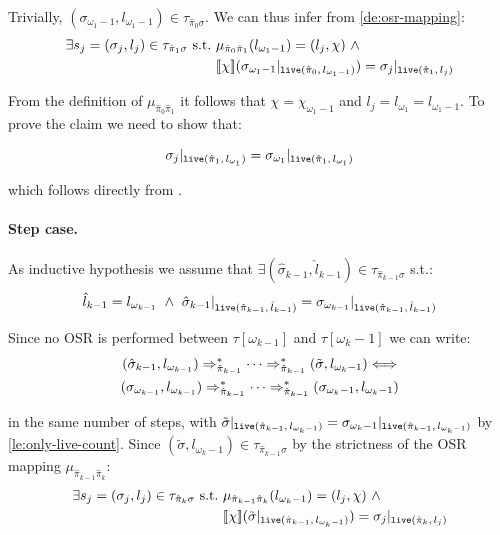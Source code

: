 \begin{myproof}
\noindent Trivially, $(\sigma_{\omega_1-1},l_{\omega_1-1})\in\tau_{\hat{\pi}_0\sigma}$. We can thus infer from \ref{de:osr-mapping}:
\begin{align*}
\exists s_j=(\sigma_j,l_j)\in\tau_{\hat{\pi}_1\sigma}~\text{s.t.}~&\mu_{\hat{\pi}_{0}\hat{\pi}_1}(l_{\omega_1-1})=(l_j,\chi)~\wedge \\
&[\![\chi]\!](\sigma_{\omega_1-1}\vert_{\text{${\tt live}$}(\hat{\pi}_{0},\,l_{\omega_1-1})})=\sigma_j\vert_{\text{${\tt live}$}(\hat{\pi}_{1},\,l_j)}
\end{align*}

\noindent From the definition of $\mu_{\hat{\pi}_{0}\hat{\pi}_1}$ it follows that $\chi=\chi_{\omega_1-1}$ and $l_j=l_{\omega_1}=l_{\omega_1-1}$. To prove the claim we need to show that:

\begin{equation*}
\sigma_j\vert_{\text{${\tt live}$}(\hat{\pi}_{1},\,l_{\omega_1})}=\sigma_{\omega_1}\vert_{\text{${\tt live}$}(\hat{\pi}_{1},\,l_{\omega_1})}
\end{equation*}

\noindent which follows directly from .

\paragraph*{Step case.} As inductive hypothesis we assume that $\exists (\hat{\sigma}_{k-1},\hat{l}_{k-1})\in\tau_{\hat{\pi}_{k-1}\sigma}$ s.t.:
\begin{equation*}
\hat{l}_{k-1}=l_{\omega_{k-1}} ~\wedge~ \hat{\sigma}_{k-1}\vert_{\text{${\tt live}$}(\hat{\pi}_{k-1},\,\hat{l}_{k-1})}=\sigma_{\omega_{k-1}}\vert_{\text{${\tt live}$}(\hat{\pi}_{k-1},\,\hat{l}_{k-1})}
\end{equation*}

\noindent
Since no OSR is performed between $\tau[\omega_{k-1}]$ and $\tau[\omega_k-1]$ we can write:
\begin{gather*}
(\hat{\sigma}_{k-1}, l_{\omega_{k-1}}) \Rightarrow^*_{\hat{\pi}_{k-1}} \cdots \Rightarrow^*_{\hat{\pi}_{k-1}} (\tilde{\sigma},l_{\omega_k-1}) \Longleftrightarrow \\
(\sigma_{\omega_{k-1}}, l_{\omega_{k-1}}) \Rightarrow^*_{\hat{\pi}_{k-1}} \cdots \Rightarrow^*_{\hat{\pi}_{k-1}} (\sigma_{\omega_k-1},l_{\omega_k-1})
\end{gather*}

\noindent in the same number of steps, with $\tilde{\sigma}\vert_{\text{${\tt live}$}(\hat{\pi}_{k-1},\,l_{\omega_k-1})} = \sigma_{\omega_k-1}\vert_{\text{${\tt live}$}(\hat{\pi}_{k-1},\,l_{\omega_k-1})}$ by \ref{le:only-live-count}. Since $(\tilde{\sigma},l_{\omega_k-1})\in\tau_{\hat{\pi}_{k-1}\sigma}$ by the strictness of the OSR mapping $\mu_{\hat{\pi}_{k-1}\hat{\pi}_{k}}$:
\begin{align*}
\exists s_j=(\sigma_j,l_j)\in\tau_{\hat{\pi}_k\sigma}~\text{s.t.}~&\mu_{\hat{\pi}_{k-1}\hat{\pi}_{k}}(l_{\omega_k-1})=(l_j,\chi)~\wedge \\
&[\![\chi]\!](\tilde{\sigma}\vert_{\text{${\tt live}$}(\hat{\pi}_{k-1},\,l_{\omega_k-1})})=\sigma_j\vert_{\text{${\tt live}$}(\hat{\pi}_{k},\,l_j)}
\end{align*}


\end{myproof}
